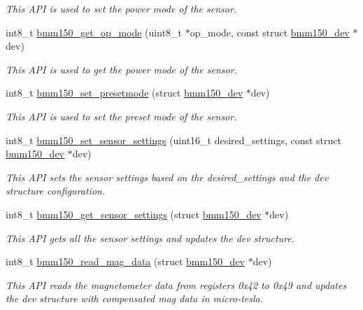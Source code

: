 \begin{DoxyCompactItemize}
\begin{DoxyCompactList}\small\item\em This A\+PI is used to set the power mode of the sensor. \end{DoxyCompactList}\item 
int8\+\_\+t \hyperlink{group___b_m_m150_ga6e4a56abf879bb4ad9a263d79974d120}{bmm150\+\_\+get\+\_\+op\+\_\+mode} (uint8\+\_\+t $\ast$op\+\_\+mode, const struct \hyperlink{structbmm150__dev}{bmm150\+\_\+dev} $\ast$dev)
\begin{DoxyCompactList}\small\item\em This A\+PI is used to get the power mode of the sensor. \end{DoxyCompactList}\item 
int8\+\_\+t \hyperlink{group___b_m_m150_gafbd9773c2f5c5645d60231f0ba7e8626}{bmm150\+\_\+set\+\_\+presetmode} (struct \hyperlink{structbmm150__dev}{bmm150\+\_\+dev} $\ast$dev)
\begin{DoxyCompactList}\small\item\em This A\+PI is used to set the preset mode of the sensor. \end{DoxyCompactList}\item 
int8\+\_\+t \hyperlink{group___b_m_m150_ga96ceb625f7af0bf71a8a7ad8aa67fe2b}{bmm150\+\_\+set\+\_\+sensor\+\_\+settings} (uint16\+\_\+t desired\+\_\+settings, const struct \hyperlink{structbmm150__dev}{bmm150\+\_\+dev} $\ast$dev)
\begin{DoxyCompactList}\small\item\em This A\+PI sets the sensor settings based on the desired\+\_\+settings and the dev structure configuration. \end{DoxyCompactList}\item 
int8\+\_\+t \hyperlink{group___b_m_m150_ga12db4420b434ac786c10494dd3f80e7f}{bmm150\+\_\+get\+\_\+sensor\+\_\+settings} (struct \hyperlink{structbmm150__dev}{bmm150\+\_\+dev} $\ast$dev)
\begin{DoxyCompactList}\small\item\em This A\+PI gets all the sensor settings and updates the dev structure. \end{DoxyCompactList}\item 
int8\+\_\+t \hyperlink{group___b_m_m150_gabdb1f4947a1e2639326420a9fc7a2b12}{bmm150\+\_\+read\+\_\+mag\+\_\+data} (struct \hyperlink{structbmm150__dev}{bmm150\+\_\+dev} $\ast$dev)
\begin{DoxyCompactList}\small\item\em This A\+PI reads the magnetometer data from registers 0x42 to 0x49 and updates the dev structure with compensated mag data in micro-\/tesla. \end{DoxyCompactList}\item 

\end{DoxyCompactItemize}
